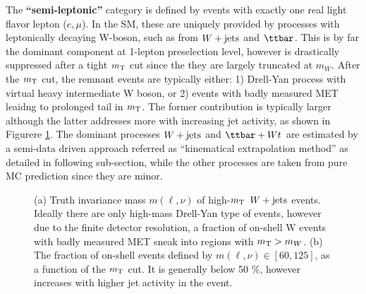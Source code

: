 The \textbf{``semi-leptonic''} category is defined by events with exactly one real light flavor lepton ($e,\mu$). In the SM, these are uniquely provided by processes with leptonically decaying W-boson, such as from $W+\mathrm{jets}$ and $\ttbar$. This is by far the dominant component at 1-lepton preselection level, however is drastically suppressed after a tight $m_{\mathrm{T}}$ cut since the they are largely truncated at $m_{W}$. After the $m_{\mathrm{T}}$ cut, the remnant events are typically either: 1) Drell-Yan process with virtual heavy intermediate W boson, or 2) events with badly measured MET leaidng to prolonged tail in $m_{\mathrm{T}}$. The former contribution is typically larger although the latter addresses more with increasing jet activity, as shown in Figurere \ref{fig::BGestimation::Wmassline}. The dominant processes $W+\mathrm{jets}$ and $\ttbar+Wt$ are estimated by a semi-data driven approach referred as ``kinematical extrapolation method'' as detailed in following sub-section, while the other processes are taken from pure MC prediction since they are minor. \\
\begin{figure}[h]
  \centering
    \caption{ (a) Truth invariance mass $m(\ell,\nu)$ of high-$m_{\mathrm{T}}$ $W+\mathrm{jets}$ events. Ideally there are only high-mass Drell-Yan type of events, however due to the finite detector resolution, a fraction of on-shell W events with badly measured MET sneak into regions with $m_{\mathrm{T}}>m_W$. (b) The fraction of on-shell events defined by $m(\ell,\nu) \in [60,125]$, as a function of the $m_{\mathrm{T}}$ cut. It is generally below 50 $\%$, however increases with higher jet activity in the event. \label{fig::BGestimation::Wmassline} }
\end{figure}

